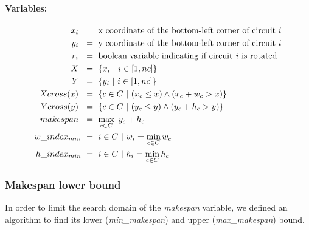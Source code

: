     \paragraph{Variables:}
    \begin{align*}
        x_i\            &\ =\ \text{x coordinate of the bottom-left corner of circuit  } i        \\
        y_i\            &\ =\ \text{y coordinate of the bottom-left corner of circuit  } i        \\
        r_i\            &\ =\ \text{boolean variable indicating if circuit \textit{i} is rotated} \\
        X\              &\ =\ \{ x_i\ |\ i \in [1, nc]\}                                          \\
        Y\              &\ =\ \{ y_i\ |\ i \in [1, nc]\}                                          \\
        Xcross(x)\      &\ =\ \{ c \in C\ |\ (x_c \leq x) \land (x_c + w_c > x) \}                \\
        Ycross(y)\      &\ =\ \{ c \in C\ |\ (y_c \leq y) \land (y_c + h_c > y) \}                \\
        makespan\       &\ =\ \max_{c \in C}\ y_c + h_c                                           \\
        w\_index_{min}  &\ =\ i \in C\ |\ w_i = \min_{c \in C} w_c                                \\
        h\_index_{min}  &\ =\ i \in C\ |\ h_i = \min_{c \in C} h_c                                \\
    \end{align*}

    \subsubsection{Makespan lower bound}
        In order to limit the search domain of the \textit{makespan} variable, we defined an algorithm to find 
        its lower (\textit{min\_makespan}) and upper (\textit{max\_makespan}) bound.

